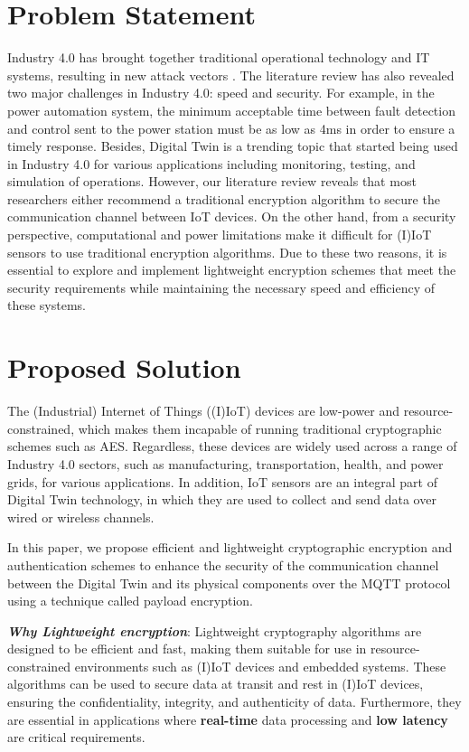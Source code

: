 
\section{Problem Statement}
Industry 4.0 has brought together traditional operational technology and IT systems, resulting in new attack vectors \cite{dietzUnleashingDigitalTwin2020}. The literature review has also revealed two major challenges in Industry 4.0: speed and security. For example, in the power automation system, the minimum acceptable time between fault detection and control sent to the power station must be as low as 4ms \cite{rajkumar_cyber_2020} in order to ensure a timely response. Besides, Digital Twin is a trending topic that started being used in Industry 4.0 for various applications including monitoring, testing, and simulation of operations. However, our literature review reveals that most researchers either recommend a traditional encryption algorithm to secure the communication channel between IoT devices. On the other hand, from a security perspective, computational and power limitations make it difficult for (I)IoT sensors to use traditional encryption algorithms. Due to these two reasons, it is essential to explore and implement lightweight encryption schemes that meet the security requirements while maintaining the necessary speed and efficiency of these systems.

\section{Proposed Solution}
The (Industrial) Internet of Things ((I)IoT) devices are low-power and resource-constrained, which makes them incapable of running traditional cryptographic schemes such as AES. Regardless, these devices are widely used across a range of Industry 4.0 sectors, such as manufacturing, transportation, health, and power grids, for various applications. In addition, IoT sensors are an integral part of Digital Twin technology, in which they are used to collect and send data over wired or wireless channels.

In this paper, we propose efficient and lightweight cryptographic encryption and authentication schemes to enhance the security of the communication channel between the Digital Twin and its physical components over the MQTT protocol using a technique called payload encryption.

\textbf{\textit{Why Lightweight encryption}}:
Lightweight cryptography algorithms are designed to be efficient and fast, making them suitable for use in resource-constrained environments such as (I)IoT devices and embedded systems.
These algorithms can be used to secure data at transit and rest in (I)IoT devices, ensuring the confidentiality, integrity, and authenticity of data. Furthermore, they are essential in applications where \textbf{real-time} data processing and \textbf{low latency} are critical requirements.

